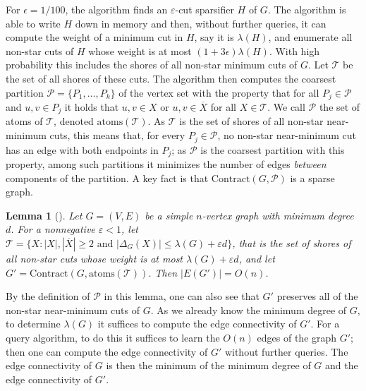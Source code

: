 \documentclass[10pt,a4paper]{article}
\newcommand{\Pcal}{\mathcal{P}}
\newcommand{\Tcal}{\mathcal{T}}
\newcommand{\atoms}{\mathrm{atoms}}
\newcommand{\Contract}{\mathrm{Contract}}
\newcommand{\1}{\mathbf{1}}
\newtheorem{lemma}[theorem]{Lemma}
\theoremstyle{definition}
\begin{document}
For $\epsilon = 1/100$, the algorithm finds an $\varepsilon$-cut sparsifier $H$ of $G$.  The algorithm is able to write $H$ down in memory and then, without further queries, it can compute the weight of a minimum cut in $H$, say it is $\lambda(H)$, and enumerate all non-star cuts of $H$ whose weight is at most $(1+ 3 \epsilon) \lambda(H)$.  
With high probability this includes the shores of all non-star minimum cuts of $G$.  Let $\Tcal$ be the set of all shores of these cuts.  
The algorithm then computes the coarsest partition $\Pcal = \{P_1, \ldots, P_k\}$ of the vertex set with the property that for all $P_j \in \Pcal$ and $u,v \in P_j$ it holds 
that $u,v \in X$ or $u,v \in \overline{X}$ for all $X \in \Tcal$.  We call $\Pcal$ the set of atoms of $\Tcal$, denoted $\atoms(\Tcal)$. 
As $\Tcal$ is the set of shores of all non-star near-minimum cuts, this means that, for every $P_j \in \Pcal$, no non-star near-minimum cut has an edge with both endpoints in $P_j$;  
as $\Pcal$ is the coarsest partition with this property, among such partitions it minimizes the number of edges \emph{between} components of the partition.  A key 
fact is that $\Contract(G,\Pcal)$ is a sparse graph.

\begin{lemma}[\cite{KT19, RSW18,LST20}]
\label{lem:RSW}
Let $G = (V,E)$ be a simple $n$-vertex graph with minimum degree $d$.  For a nonnegative $\varepsilon < 1$, let 
$\Tcal = \{X : |X|, |\overline{X}| \ge 2 \mbox{ and } |\Delta_G(X)| \le \lambda(G) + \varepsilon d\}$, that is the set of shores of all non-star cuts whose weight is at most $\lambda(G) + \varepsilon d$, and let $G' = \Contract(G, \atoms(\Tcal))$.  Then 
$|E(G')| = O(n)$.
\end{lemma}
By the definition of $\Pcal$ in this lemma, one can also see that $G'$
preserves all of the non-star near-minimum cuts of $G$.  As we already know the minimum degree of $G$, to determine $\lambda(G)$ it suffices to compute 
the edge connectivity of $G'$.  For a query algorithm, to do this it suffices to learn the $O(n)$ edges of the graph $G'$; 
then one can compute the edge connectivity of $G'$ without further queries.  The edge connectivity of $G$ is then the minimum of the minimum degree of $G$ and the 
edge connectivity of $G'$.  
\end{document}
